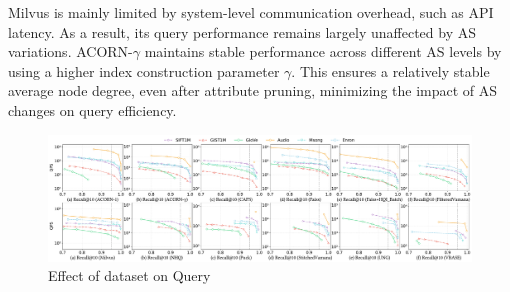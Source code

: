 \documentclass[sigconf, nonacm]{acmart}
\begin{document}
Milvus is mainly limited by system-level communication overhead, such as API latency. As a result, its query performance remains largely unaffected by AS variations. ACORN-\(\gamma\) maintains stable performance across different AS levels by using a higher index construction parameter $\gamma$. This ensures a relatively stable average node degree, even after attribute pruning, minimizing the impact of AS changes on query efficiency.

\begin{figure}
    \centering
    \includegraphics[width=\textwidth]{figures/exp/exp_6_1.pdf}
    \caption{Effect of dataset on Query}
    \label{fig:exp_6_1}
\end{figure}


\begin{table}[t]
\centering
\setlength{\abovecaptionskip}{0.05cm}
\caption{Time and space overhead of range filtering index construction}

\label{tab:Range Filtered}
\end{table}
\end{document}
